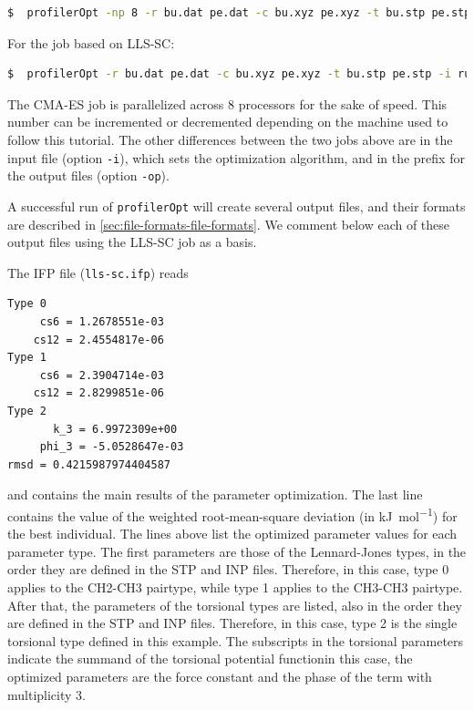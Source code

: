 \documentclass[10pt,a4paper,openany]{memoir}
\numberwithin{equation}{section}
\newcommand{\profileropt}[0]{\texttt{profilerOpt}}
\begin{document}
\begin{lstlisting}[language=bash]
$  profilerOpt -np 8 -r bu.dat pe.dat -c bu.xyz pe.xyz -t bu.stp pe.stp -i run_cmaes.inp -op cmaes
\end{lstlisting}\vspace{2ex}\par

\noindent For the job based on LLS-SC:

\begin{lstlisting}[language=bash]
$  profilerOpt -r bu.dat pe.dat -c bu.xyz pe.xyz -t bu.stp pe.stp -i run_lls-sc.inp -op lls-sc
\end{lstlisting}\vspace{2ex}\par

\noindent
The CMA-ES job is parallelized across 8 processors for the sake of
speed.  This number can be incremented or decremented depending on the
machine used to follow this tutorial.
%
The other differences between the two jobs above are in the input file
(option \texttt{-i}), which sets the optimization algorithm, and in
the prefix for the output files (option \texttt{-op}).

A successful run of \profileropt{} will create several output files,
and their formats are described in
\autoref{sec:file-formats-file-formats}.
%
We comment below each of these output files using the LLS-SC job as a
basis.
%

The IFP file (\texttt{lls-sc.ifp}) reads

\begin{lstlisting}[language=gromacs]
Type 0
     cs6 = 1.2678551e-03     
    cs12 = 2.4554817e-06     
Type 1
     cs6 = 2.3904714e-03     
    cs12 = 2.8299851e-06     
Type 2
       k_3 = 6.9972309e+00     
     phi_3 = -5.0528647e-03    
rmsd = 0.4215987974404587
\end{lstlisting}\vspace{2ex}\par

\noindent
and contains the main results of the parameter optimization.  The last
line contains the value of the weighted root-mean-square deviation (in
\si{\kJ\per\mole}) for the best individual.  The lines above list the
optimized parameter values for each parameter type.  The first
parameters are those of the Lennard-Jones types, in the order they are
defined in the STP and INP files.  Therefore, in this case, type 0
applies to the CH2-CH3 pairtype, while type 1 applies to the CH3-CH3
pairtype.  After that, the parameters of the torsional types are
listed, also in the order they are defined in the STP and INP files.
Therefore, in this case, type 2 is the single torsional type defined
in this example. The subscripts in the torsional parameters indicate
the summand of the torsional potential function\textemdash{}in this
case, the optimized parameters are the force constant and the phase of
the term with multiplicity 3.
\end{document}
